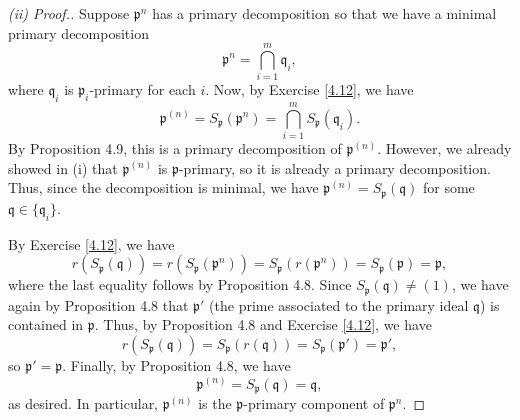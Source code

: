 \begin{proof}[(ii) Proof.]
Suppose $\mathfrak{p}^n$ has a primary decomposition so that we have a minimal primary decomposition
$$\mathfrak{p}^n = \bigcap_{i=1}^m \mathfrak{q}_i,$$
where $\mathfrak{q}_i$ is $\mathfrak{p}_i$-primary for each $i$. Now, by Exercise \ref{4.12}, we have
$$\mathfrak{p}^{(n)} = S_{\mathfrak{p}}(\mathfrak{p}^n) = \bigcap_{i=1}^m S_{\mathfrak{p}}(\mathfrak{q}_i).$$
By Proposition 4.9, this is a primary decomposition of $\mathfrak{p}^{(n)}$. However, we already showed in (i)
that $\mathfrak{p}^{(n)}$ is $\mathfrak{p}$-primary, so it is already a primary decomposition. Thus, since the decomposition is minimal, 
we have $\mathfrak{p}^{(n)} = S_{\mathfrak{p}}(\mathfrak{q})$ for some $\mathfrak{q} \in \{\mathfrak{q}_i\}$. 

By Exercise \ref{4.12}, we have
$$r(S_{\mathfrak{p}}(\mathfrak{q})) = r(S_{\mathfrak{p}}(\mathfrak{p}^n)) = S_{\mathfrak{p}}(r(\mathfrak{p}^n)) = S_{\mathfrak{p}}(\mathfrak{p}) = \mathfrak{p},$$
where the last equality follows by Proposition 4.8. Since $S_{\mathfrak{p}}(\mathfrak{q}) \neq (1)$, we have again by Proposition 4.8 that $\mathfrak{p}'$ 
(the prime associated to the primary ideal $\mathfrak{q}$) is contained in $\mathfrak{p}$. Thus, by Proposition 4.8 and Exercise \ref{4.12}, we have 
$$r(S_{\mathfrak{p}}(\mathfrak{q})) = S_{\mathfrak{p}}(r(\mathfrak{q})) = S_{\mathfrak{p}}(\mathfrak{p}') = \mathfrak{p}',$$
so $\mathfrak{p}' = \mathfrak{p}$. Finally, by Proposition 4.8, we have 
$$\mathfrak{p}^{(n)} = S_{\mathfrak{p}}(\mathfrak{q}) = \mathfrak{q},$$
as desired. In particular, $\mathfrak{p}^{(n)}$ is the $\mathfrak{p}$-primary component of $\mathfrak{p}^n$.
\end{proof}

